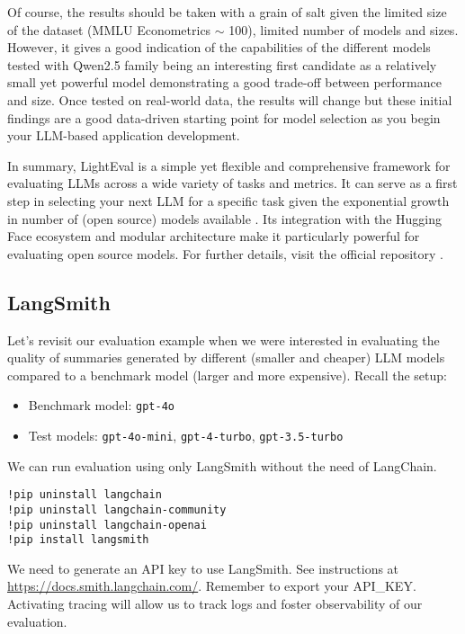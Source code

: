 Of course, the results should be taken with a grain of salt given the limited size of the dataset (MMLU Econometrics $\sim$ 100), limited number of models and sizes. However, it gives a good indication of the capabilities of the different models tested with Qwen2.5 family being an interesting first candidate as a relatively small yet powerful model demonstrating a good trade-off between performance and size. Once tested on real-world data, the results will change but these initial findings are a good data-driven starting point for model selection as you begin your LLM-based application development.

In summary, LightEval is a simple yet flexible and comprehensive framework for evaluating LLMs across a wide variety of tasks and metrics. It can serve as a first step in selecting your next LLM for a specific task given the exponential growth in number of (open source) models available . Its integration with the Hugging Face ecosystem and modular architecture make it particularly powerful for evaluating open source models. For further details, visit the official repository .
\subsection{LangSmith}

Let's revisit our evaluation example when we were interested in evaluating the quality of summaries generated by different (smaller and cheaper) LLM models compared to a benchmark model (larger and more expensive). Recall the setup:

\begin{itemize}
\item Benchmark model: \texttt{gpt-4o}
\item Test models: \texttt{gpt-4o-mini}, \texttt{gpt-4-turbo}, \texttt{gpt-3.5-turbo}
\end{itemize}

We can run evaluation using only LangSmith without the need of LangChain.

\begin{verbatim}
!pip uninstall langchain
!pip uninstall langchain-community 
!pip uninstall langchain-openai
!pip install langsmith
\end{verbatim}

We need to generate an API key to use LangSmith. See instructions at \url{https://docs.smith.langchain.com/}. Remember to export your API\_KEY. Activating tracing will allow us to track logs and foster observability of our evaluation.

